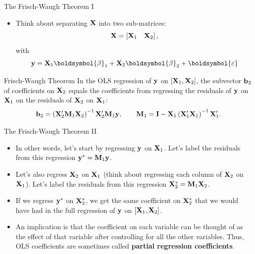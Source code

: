 \documentclass[aspectratio=169,11pt]{beamer}
\begin{document}
\begin{frame}{The Frisch-Waugh Theorem I}
\begin{itemize}
	\item Think about separating $ {\bf X}$ into two sub-matrices:\[
	 {\bf X} =  \left[{\bf X}_{1}\quad  {\bf X}_2 \right],
	\]
	with \[
	{\bf y} = {\bf X}_{1} \boldsymbol{\beta}_{1} +  {\bf X}_{2} \boldsymbol{\beta}_{2} + \boldsymbol{\varepsilon}
	\]
\end{itemize}

\begin{block}{Frisch-Waugh Theorem}
In the OLS regression of ${\bf y} $ on $\left[{\bf X}_{1},  {\bf X}_2 \right]$,
the subvector ${\bf b}_{2}$ of coefficients on ${\bf X}_{2}$ equals the coefficients from regressing
the residuals of ${\bf y}$ on ${\bf X}_{1}$ on the residuals of ${\bf X}_{2}$ on ${\bf X}_{1}$:
\[
{\bf b}_{2} = \left({\bf X}_{2}'{\bf M}_{1}{\bf X}_{2}\right)^{-1}{\bf X}_{2}'{\bf M}_{1}{\bf y},
\qquad {\bf M}_{1} = {\bf I} - {\bf X}_{1}\left({\bf X}_{1}'{\bf X}_{1}\right)^{-1}{\bf X}_{1}'.
\]

\end{block}
\end{frame}

\begin{frame}{The Frisch-Waugh Theorem II}
\begin{itemize}
	\item In other words, let's start by regressing ${\bf y} $ on ${\bf X}_{1}$.
	Let's label the residuals from this regression ${\bf y}^{*} = {\bf M}_{1}{\bf y}$.

	\item Let's also regress ${\bf X}_{2}$ on ${\bf X}_{1}$ 
	(think about regressing each column of ${\bf X}_{2}$ on ${\bf X}_{1}$).
	Let's label the residuals from this regression ${\bf X}^{*}_{2} = {\bf M}_{1}{\bf X}_{2}$.

	\item If we regress ${\bf y}^{*}$ on ${\bf X}^{*}_{2}$, we get the same
	coefficient on ${\bf X}^{*}_{2}$ that we would have had in the full
	regression of  ${\bf y} $ on $\left[{\bf X}_{1},  {\bf X}_2 \right]$.

	\item An implication is that
	the coefficient on each variable can be thought of as the effect
	of that variable after controlling for all the other variables. Thus,
	OLS coefficients are sometimes called {\bf partial regression coefficients}.

\end{itemize}
\end{frame}
\end{document}
